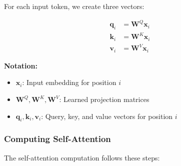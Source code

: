 For each input token, we create three vectors:

\begin{equation}
\begin{aligned}
\mathbf{q}_i &= \mathbf{W}^Q \mathbf{x}_i \\
\mathbf{k}_i &= \mathbf{W}^K \mathbf{x}_i \\
\mathbf{v}_i &= \mathbf{W}^V \mathbf{x}_i
\end{aligned}
\end{equation}
\begin{notationbox}
\textbf{Notation:}
\begin{itemize}
    \item $\mathbf{x}_i$: Input embedding for position $i$
    \item $\mathbf{W}^Q, \mathbf{W}^K, \mathbf{W}^V$: Learned projection matrices
    \item $\mathbf{q}_i, \mathbf{k}_i, \mathbf{v}_i$: Query, key, and value vectors for position $i$
\end{itemize}
\end{notationbox}

\subsubsection{Computing Self-Attention}

The self-attention computation follows these steps:

